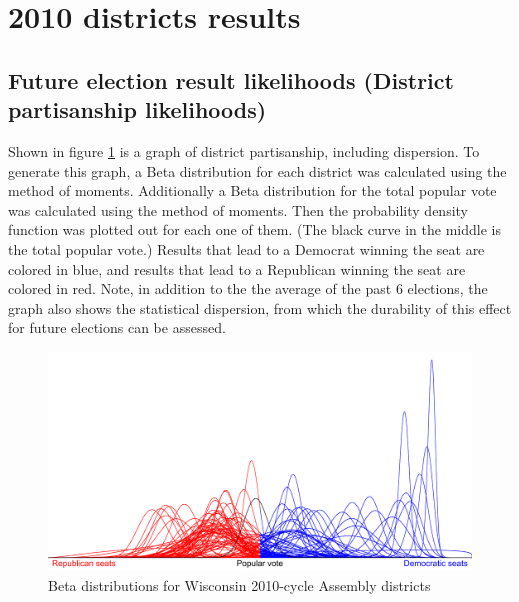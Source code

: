\documentclass[preprint,12pt]{article}
\begin{document}
\section{2010 districts results}
\subsection{Future election result likelihoods (District partisanship likelihoods)}
 
Shown in figure \ref{fig:Betas} is a graph of district partisanship, including dispersion.  To generate this graph, a Beta distribution for each district was calculated using the method of moments.  Additionally a Beta distribution for the total popular vote was calculated using the method of moments.  Then the probability density function was plotted out for each one of them.  (The black curve in the middle is the total popular vote.) Results that lead to a Democrat winning the seat are colored in blue, and results that lead to a Republican winning the seat are colored in red.
Note, in addition to the the average of the past 6 elections, the graph also shows the statistical dispersion, from which the durability of this effect for future elections can be assessed.

\begin{figure}[htb!]
    \begin{center}
        \includegraphics[scale=0.25]{../Figures/WI2010/Betas_cropped.png}
        \caption{Beta distributions for Wisconsin 2010-cycle Assembly districts}\label{fig:Betas}
    \end{center}
\end{figure}
 
\end{document}
